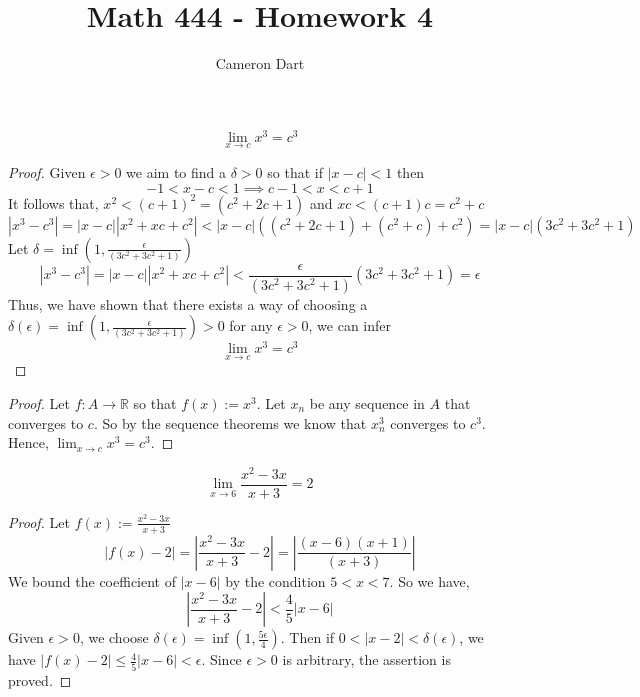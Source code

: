 \documentclass[12pt]{article}
\newcommand{\R}{\mathbb{R}}
\newenvironment{claim}[2][Claim]{\begin{trivlist}
		\item[\hskip \labelsep {\bfseries #1}\hskip \labelsep {\bfseries #2}]}{\end{trivlist}}
\begin{document}
	\title{Math 444 - Homework 4}
	\author{Cameron Dart}
	\maketitle

\begin{claim}{4.1.7}
	\[  \lim_{x \rightarrow c} x^3 = c^3  \]
\end{claim}

\begin{proof}
	Given $\epsilon > 0$ we aim to find a $\delta > 0$ so that if $|x - c| < 1$ then
	\[ -1 < x - c < 1 \implies c - 1 < x < c + 1 \]
	It follows that, $x^2 < (c + 1) ^2 = (c^2 + 2c + 1)$ and $xc < (c + 1)c = c^2 + c$ 
	\[ 
	  |x^3 - c^3| = |x - c| |x^2 + xc + c^2| < | x - c | ((c^2 + 2c + 1) + (c^2 + c) + c^2) = |x - c| (3c^2 + 3c^2 + 1)
	\]
	Let $\delta = \inf(1, \frac{\epsilon}{(3c^2 + 3c^2 + 1)})$\\
	\[
	|x^3 - c^3| = |x - c| |x^2 + xc + c^2| <  \frac{\epsilon}{(3c^2 + 3c^2 + 1)}  (3c^2 + 3c^2 + 1) = \epsilon
	\]
	Thus, we have shown that there exists a way of choosing a $\delta(\epsilon) = \inf(1,  
	\frac{\epsilon}{(3c^2 + 3c^2 + 1)})> 0$ for any $\epsilon > 0$, we can infer 
	 \[ \lim_{x \rightarrow c} x^3 = c^3  \]
\end{proof}

\begin{proof}
	Let $f: A \rightarrow \R$ so that $f(x):=x^3$. Let $x_n$ be any sequence in $A$ that converges to $c$. So by the sequence theorems we know that $x_n^3$ converges to $c^3$. Hence,
	$\lim_{x \rightarrow c} x^3 = c^3$.
\end{proof}

\begin{claim}{4.2.11b}
	\[
		\lim_{x \rightarrow 6} \frac{x^2 - 3x}{x + 3} = 2
	\]
\end{claim}
\begin{proof}
	Let $f(x):= \frac{x^2 - 3x}{x + 3} $
	\[
		|f(x) - 2| = \left |\frac{x^2 - 3x}{x + 3} - 2 \right | = \left | \frac{(x-6)(x+1) }{(x+3)} \right | 
	\]
	We bound the coefficient of $|x-6|$ by the condition $5 < x < 7$. So we have,
	\[
	 \left |\frac{x^2 - 3x}{x + 3} - 2 \right | < \frac{4}{5} |x - 6|	
	\]
	Given $\epsilon > 0$, we choose $\delta(\epsilon) = \inf (1,\frac{5\epsilon}{4})$. Then if $0 < |x - 2| < \delta(\epsilon)$, we have $|f(x) - 2| \leq \frac{4}{5}|x - 6| < \epsilon$. Since $\epsilon > 0$ is arbitrary, the assertion is proved. 
\end{proof}
\end{document}
